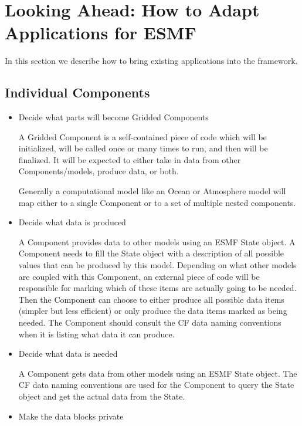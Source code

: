 
\section{Looking Ahead:  How to Adapt Applications for ESMF}
\label{sec:Adoption}

In this section we describe how to bring existing applications into the framework.

\subsection{Individual Components}

\begin{itemize}

\item Decide what parts will become Gridded Components 

A Gridded Component is a self-contained
piece of code which will be initialized, will be called once or many times
to run, and then will be finalized.  It will be expected to either take in
data from other Components/models, produce data, or both.

Generally a computational model like an Ocean or Atmosphere model will
map either to a single Component or to a set of multiple nested
components.

\item Decide what data is produced 

A Component provides data to other models using an ESMF State
object.  A Component needs to fill the State object with a description of
all possible values that can be produced by this model.  Depending on what
other models are coupled with this Component, an external piece of code
will be responsible for marking which of these items are actually going to
be needed.  Then the Component can choose to either produce all possible
data items (simpler but less efficient) or only produce the data items
marked as being needed.  The Component should consult the CF data naming
conventions when it is listing what data it can produce.

\item Decide what data is needed 

A Component gets data from other models using an ESMF State object.
The CF data naming conventions are used for the Component to query
the State object and get the actual data from the State.

\item Make the data blocks private 


\end{itemize}
